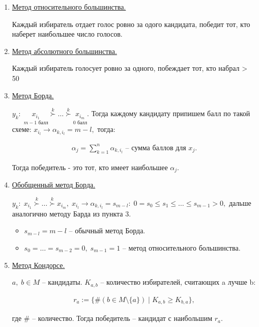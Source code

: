 \begin{enumerate}
	\item \underline{Метод относительного большинства.}

	Каждый избиратель отдает голос ровно за одого кандидата, победит тот, кто наберет наибольшее число голосов.

	\item \underline{Метод абсолютного большинства.}

	Каждый избиратель голосует ровно за одного, побеждает тот, кто набрал > 50%

	\item \underline{Метод Борда.}

	$y_k: \; \underset{m-1 \text{ балл}}{x_{i_1}} \stackrel{k}{\succ} \ldots \stackrel{k}{\succ} \underset{0 \text{ балл}}{x_{i_m}}$. Тогда каждому кандидату припишем балл по такой схеме: $x_{i_l} \rightarrow \alpha_{k, i_l} = m - l, $ тогда:

	\begin{gather*}
		\alpha_j = \sum \limits_{k = 1}^n \alpha_{k, i_l} \text{ -- сумма баллов для } x_j.
	\end{gather*}

	Тогда победитель - это тот, кто имеет наибольшее $\alpha_j.$

	\item \underline{Обобщенный метод Борда.}

	$y_k: \; x_{i_1} \stackrel{k}{\succ} \ldots \stackrel{k}{\succ} x_{i_m}, \; x_{i_l} \rightarrow \alpha_{k, i_l} = s_{m - l}: \; 0 = s_0 \leq s_1 \leq \ldots \leq s_{m - 1} > 0,$ дальше аналогично методу Барда из пункта 3.

	\begin{remark}
		\begin{itemize}
			\item $s_{m - l} = m - l$ -- обычный метод Борда.
			\item $s_0 = \ldots = s_{m - 2} = 0, \; s_{m - 1} = 1$ -- метод относительного большинства.
		\end{itemize}
	\end{remark}

	\item \underline{Метод Кондорсе.}

	$a, \; b \in M $ -- кандидаты. $K_{a, b}$ -- количество избирателей, считающих a лучше b: 

	\begin{gather*}
		r_a := \{ \#(b \in M\setminus\{ a \}) \mid K_{a, b} \geq K_{b, a} \},
	\end{gather*}

	где $\#$ -- количество. Тогда победитель -- кандидат с наибольшим $r_a$.
\end{enumerate}

